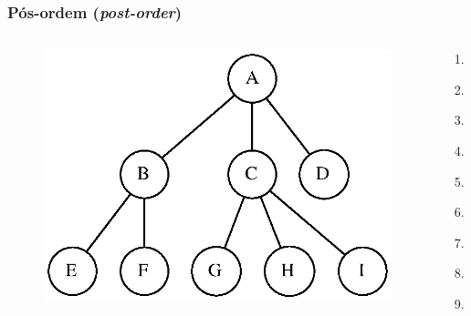 \documentclass[aspectratio=169]{beamer}
\begin{document}
\begin{frame}\frametitle{Pós-ordem (\emph{post-order})}
\begin{columns}[T]
\begin{column}{0.7\linewidth}
\begin{figure}[h]
	\centering
	\includegraphics[height=0.5\paperheight]{imagens/arvore_d.eps}
\end{figure}
\end{column}
\begin{column}{0.3\linewidth}
\pause
\begin{enumerate}
	\item E
	\item F
	\item B
	\item G
	\item H
	\item I
	\item C
	\item D
	\item A
\end{enumerate}
\end{column}
\end{columns}
\end{frame}
\end{document}
